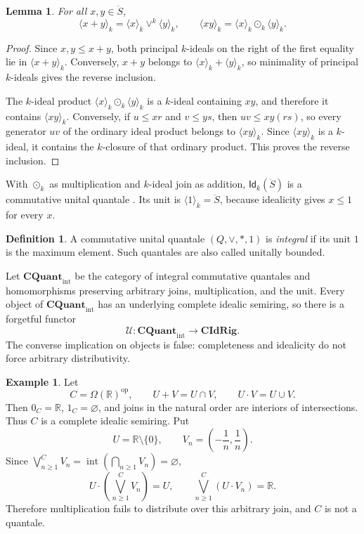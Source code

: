 \documentclass[12pt,leqno]{amsart}
\newcommand{\QuantTop}{\mathbf{CQuant}_{\mathrm{int}}}
\newcommand{\CIdRig}{\mathbf{CIdRig}}
\newcommand{\Idk}{\mathsf{Id}_{k}}
\newcommand{\op}{\mathrm{op}}
\newtheorem{lemma}[theorem]{Lemma}
\theoremstyle{definition}
\newtheorem{definition}{Definition}[section]
\newtheorem{example}[theorem]{Example}
\numberwithin{equation}{section}
\theoremstyle{remark}
\def\leq{\leqslant}
\begin{document}
\begin{lemma}\label{lem:principal-k-ideals}
For all \(x,y\in\ddot S\),
\[
\langle x+y\rangle_k
 =\langle x\rangle_k\vee^k\langle y\rangle_k,
\qquad
\langle xy\rangle_k
 =\langle x\rangle_k\odot_k\langle y\rangle_k.
\]
\end{lemma}

\begin{proof}
Since \(x,y\leq x+y\), both principal $k$-ideals on the right of the first equality lie in \(\langle x+y\rangle_k\). Conversely, \(x+y\) belongs to
\(\langle x\rangle_k+\langle y\rangle_k\), so minimality of principal $k$-ideals gives the reverse inclusion.

The $k$-ideal product \(\langle x\rangle_k\odot_k\langle y\rangle_k\) is a $k$-ideal containing $xy$, and therefore it contains \(\langle xy\rangle_k\). Conversely, if \(u\leq xr\) and \(v\leq ys\), then
\(uv\leq xy(rs)\), so every generator $uv$ of the ordinary ideal product belongs to \(\langle xy\rangle_k\). Since \(\langle xy\rangle_k\) is a $k$-ideal, it contains the $k$-closure of that ordinary product. This proves the reverse inclusion.
\end{proof}

With \(\odot_k\) as multiplication and $k$-ideal join as addition, \(\Idk(\ddot S)\) is a commutative unital quantale \cite[Lemmas~3.27 and~3.28]{Ray22}. Its unit is \(\langle1\rangle_k=\ddot S\), because idealicity gives \(x\leq1\) for every $x$.

\begin{definition}\label{def:unitally-bounded-quantale}
A commutative unital quantale \((Q,\vee,*,1)\) is \emph{integral} if its unit $1$ is the maximum element. Such quantales are also called unitally bounded.
\end{definition}

Let \(\QuantTop\) be the category of integral commutative quantales and homomorphisms preserving arbitrary joins, multiplication, and the unit. Every object of \(\QuantTop\) has an underlying complete idealic semiring, so there is a forgetful functor
\[
\mathcal U\colon\QuantTop\longrightarrow\CIdRig.
\]
The converse implication on objects is false: completeness and idealicity do not force arbitrary distributivity.

\begin{example}\label{ex:complete-idealic-not-quantale}
Let
\[
C=\Omega(\mathds{R})^{\op},
\qquad
U+V=U\cap V,
\qquad
U\cdot V=U\cup V.
\]
Then \(0_C=\mathds{R}\), \(1_C=\varnothing\), and joins in the natural order are interiors of intersections. Thus $C$ is a complete idealic semiring. Put
\[
U=\mathds{R}\setminus\{0\},
\qquad
V_n=\left(-\frac1n,\frac1n\right).
\]
Since
\(\bigvee^C_{n\geq1}V_n=\operatorname{int}(\bigcap_{n\geq1}V_n)=\varnothing\),
\[
U\cdot\left(\bigvee^C_{n\geq1}V_n\right)=U,
\qquad
\bigvee^C_{n\geq1}(U\cdot V_n)=\mathds{R}.
\]
Therefore multiplication fails to distribute over this arbitrary join, and $C$ is not a quantale.
\end{example}
\end{document}
